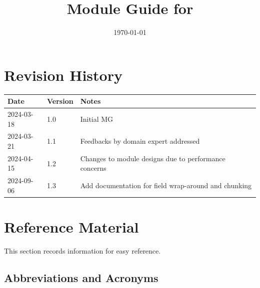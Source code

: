 \documentclass[12pt, titlepage]{article}
\begin{document}
\title{Module Guide for \progname{}} 
\author{\authname}
\date{\today}

\maketitle


\section{Revision History}

\begin{tabularx}{\textwidth}{p{3cm}p{2cm}X}
\toprule {\bf Date} & {\bf Version} & {\bf Notes}\\
\midrule
2024-03-18 & 1.0 & Initial MG\\
2024-03-21 & 1.1 & Feedbacks by domain expert addressed\\
2024-04-15 & 1.2 & Changes to module designs due to performance concerns\\
2024-09-06 & 1.3 & Add documentation for field wrap-around and chunking\\
\bottomrule
\end{tabularx}

\newpage

\section{Reference Material}

This section records information for easy reference.

\subsection{Abbreviations and Acronyms}
\end{document}
